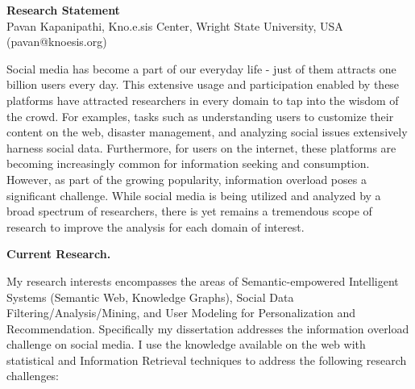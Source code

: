 \documentclass[12pt]{letter} %
\begin{document}


{\large\bf Research Statement} \\ %
Pavan Kapanipathi, Kno.e.sis Center, Wright State University, USA (pavan@knoesis.org)

\noindent\makebox[\linewidth]{\rule{\linewidth}{0.4pt}}
\vspace{0.1in}

Social media has become a part of our everyday life - just of them attracts one billion users every day. This extensive usage and participation enabled by these platforms have attracted researchers in every domain to tap into the wisdom of the crowd. For examples, tasks such as understanding users to customize their content on the web, disaster management, and analyzing social issues extensively harness social data. Furthermore, for users on the internet, these platforms are becoming increasingly common for information seeking and consumption. However, as part of the growing popularity, information overload poses a significant challenge. While social media is being utilized and analyzed by a broad spectrum of researchers, there is yet remains a tremendous scope of research to improve the analysis for each domain of interest.

\vspace{1.0em} 
\textbf{Current Research.}
\vspace{0.3em}

My research interests encompasses the areas of Semantic-empowered Intelligent Systems (Semantic Web, Knowledge Graphs), Social Data Filtering/Analysis/Mining, and User Modeling for Personalization and Recommendation. Specifically my dissertation addresses the information overload challenge on social media. I use the knowledge available on the web with statistical and Information Retrieval techniques
 to address the following research challenges: 
\end{document}
